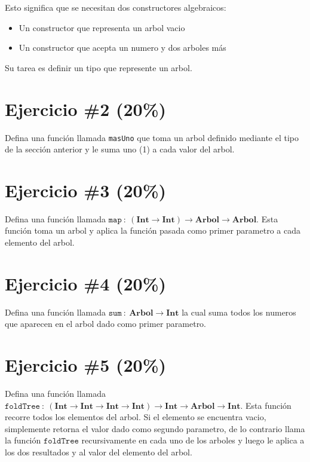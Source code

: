 \documentclass{article}
\begin{document}
Esto significa que se necesitan dos constructores algebraicos:
\begin{itemize}
        \item{Un constructor que representa un arbol vacio}
        \item{Un constructor que acepta un numero y dos arboles m\'as}
\end{itemize}

Su tarea es definir un tipo que represente un arbol.

\section*{Ejercicio \#2 (20\%)}

Defina una funci\'on llamada \texttt{masUno} que toma un arbol definido mediante el tipo
de la secci\'on anterior y le suma uno (1) a cada valor del arbol.

\section*{Ejercicio \#3 (20\%)}

Defina una funci\'on llamada $\mathtt{map}\ :\ (\mathbf{Int}\rightarrow\mathbf{Int})\rightarrow
\mathbf{Arbol} \rightarrow \mathbf{Arbol}$. Esta funci\'on toma un arbol y aplica la funci\'on
pasada como primer parametro a cada elemento del arbol.


\section*{Ejercicio \#4 (20\%)}

Defina una funci\'on llamada $\mathtt{sum}\ :\ \mathbf{Arbol}\rightarrow\mathbf{Int}$ la
cual suma todos los numeros que aparecen en el arbol dado como primer parametro.

\section*{Ejercicio \#5 (20\%)}

Defina una funci\'on llamada $\mathtt{foldTree}\ :\ (\mathbf{Int}\rightarrow\mathbf{Int}
\rightarrow\mathbf{Int}\rightarrow\mathbf{Int})\rightarrow\mathbf{Int}\rightarrow\mathbf{Arbol}\rightarrow\mathbf{Int}$.
Esta funci\'on recorre todos los elementos del arbol. Si el elemento se encuentra vacio,
simplemente retorna el valor dado como segundo parametro, de lo contrario llama la funci\'on
$\mathtt{foldTree}$ recursivamente en cada uno de los arboles y luego le aplica a los
dos resultados y al valor del elemento del arbol.
\end{document}
